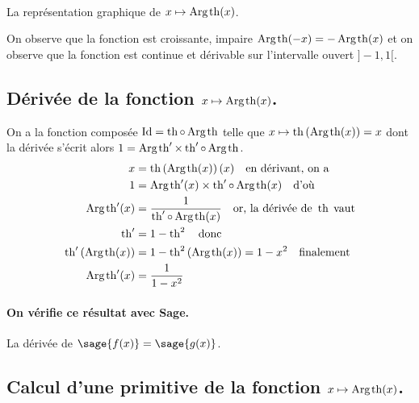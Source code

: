 \documentclass[a4paper,12pt]{report}
\def\Id{\ensuremath{\mathrm{Id}}}
\renewcommand{\tanh}{\mathop{\mathrm{th}}}
\renewcommand{\arg}{\mathop{\mathrm{Arg}}}
\begin{document}
\begin{center}
 \\
La représentation graphique de $x \mapsto \arg\mspace{-1mu}\tanh(x)$.
\end{center}
On observe que la fonction est croissante, impaire $\arg\mspace{-1mu}\tanh(-x) = -\arg\mspace{-1mu}\tanh(x) $
et on observe que la fonction est continue et dérivable sur l'intervalle ouvert $]-1,1[$.                                                                                                             

\subsection{Dérivée de la fonction $x \mapsto \arg\mspace{-1mu}\tanh(x)$.}
On a la fonction composée $\Id = \tanh \circ \arg\mspace{-1mu}\tanh$ telle que $x\mapsto\tanh\left(\arg\mspace{-1mu}\tanh(x)\right)=x$ dont la dérivée s'écrit alors $1= \arg\mspace{-1mu}\tanh\nolimits' \times \tanh\nolimits'\circ\arg\mspace{-1mu}\tanh$.
\begin{align*}
x & =\tanh\left(\arg\mspace{-1mu}\tanh(x)\right)(x) \quad \textrm{en dérivant, on a}\\
1 & = \arg\mspace{-1mu}\tanh\nolimits'(x) \times \tanh\nolimits'\circ\arg\mspace{-1mu}\tanh(x) \quad \textrm{d'où}\\
\arg\mspace{-1mu}\tanh\nolimits'(x) & =\frac{1}{ \tanh\nolimits'\circ\arg\mspace{-1mu}\tanh(x)}\quad \textrm{or, la dérivée de } \tanh \; \textrm{vaut}\\
\tanh\nolimits' & = 1-\tanh\nolimits^2 \quad \textrm{donc} \\
\tanh\nolimits'\left(\arg\mspace{-1mu}\tanh(x)\right) & = 1 - \tanh\nolimits^2 \left(\arg\mspace{-1mu}\tanh(x)\right) = 1 - x^2 \quad \textrm{finalement}\\
\arg\mspace{-1mu}\tanh\nolimits'(x) & = \frac{1}{ 1- x^2} 
\end{align*}
\paragraph{On vérifie ce résultat avec Sage.}
La dérivée de $\sage{f(x)} = \sage{g(x)} $.


\subsection{Calcul d'une primitive de la fonction  $x \mapsto \arg\mspace{-1mu}\tanh(x)$.}
\end{document}
